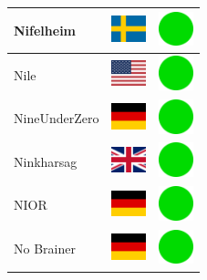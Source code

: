 \documentclass[12pt, a4paper, twoside]{report}
\begin{document}
\begin{center}
\begin{longtable}{|p{5cm}|p{2cm}|p{2cm}|}
 Nifelheim                                                  & \includegraphics[width=1cm]{../4x3/se} &   \includegraphics[width=1cm]{../likes/y} \\ \hline
 Nile                                                       & \includegraphics[width=1cm]{../4x3/us} &   \includegraphics[width=1cm]{../likes/y} \\ \hline
 NineUnderZero                                              & \includegraphics[width=1cm]{../4x3/de} &   \includegraphics[width=1cm]{../likes/y} \\ \hline
 Ninkharsag                                                 & \includegraphics[width=1cm]{../4x3/gb} &   \includegraphics[width=1cm]{../likes/y} \\ \hline
 NIOR                                                       & \includegraphics[width=1cm]{../4x3/de} &   \includegraphics[width=1cm]{../likes/y} \\ \hline
 No Brainer                                                 & \includegraphics[width=1cm]{../4x3/de} &   \includegraphics[width=1cm]{../likes/y} \\ \hline

\end{longtable}
\end{center}
\end{document}
